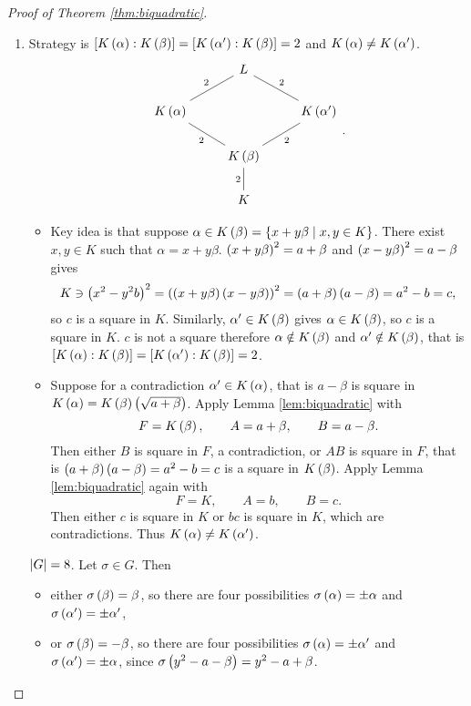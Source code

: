 \begin{proof}[Proof of Theorem \ref{thm:biquadratic}]
\hfill
\begin{enumerate}
\item Strategy is $ \left[ K\left( \alpha \right) : K\left( \beta \right) \right] = \left[ K\left( \alpha' \right) : K\left( \beta \right) \right] = 2 $ and $ K\left( \alpha \right) \ne K\left( \alpha' \right) $.
$$
\begin{tikzcd}
& L & \\
K\rb{\alpha} \arrow[dash]{ur}{2} & & K\rb{\alpha'} \arrow[dash, swap]{ul}{2} \\
& K\rb{\beta} \arrow[dash]{ul}{2} \arrow[dash, swap]{ur}{2} & \\
& K \arrow[dash]{u}{2} &
\end{tikzcd}.
$$
\begin{itemize}
\item Key idea is that suppose $ \alpha \in K\left( \beta \right) = \left\{ x + y\beta \mid x, y \in K \right\} $. There exist $ x, y \in K $ such that $ \alpha = x + y\beta $. $ \left( x + y\beta \right)^2 = a + \beta $ and $ \left( x - y\beta \right)^2 = a - \beta $ gives
$$ K \ni \left( x^2 - y^2b \right)^2 = \left( \left( x + y\beta \right)\left( x - y\beta \right) \right)^2 = \left( a + \beta \right)\left( a - \beta \right) = a^2 - b = c, $$
so $ c $ is a square in $ K $. Similarly, $ \alpha' \in K\left( \beta \right) $ gives $ \alpha \in K\left( \beta \right) $, so $ c $ is a square in $ K $. $ c $ is not a square therefore $ \alpha \notin K\left( \beta \right) $ and $ \alpha' \notin K\left( \beta \right) $, that is $ \left[ K\left( \alpha \right) : K\left( \beta \right) \right] = \left[ K\left( \alpha' \right) : K\left( \beta \right) \right] = 2 $.
\item Suppose for a contradiction $ \alpha' \in K\left( \alpha \right) $, that is $ a - \beta $ is square in $ K\left( \alpha \right) = K\left( \beta \right)\left( \sqrt{a + \beta} \right) $. Apply Lemma \ref{lem:biquadratic} with
$$ F = K\left( \beta \right), \qquad A = a + \beta, \qquad B = a - \beta. $$
Then either $ B $ is square in $ F $, a contradiction, or $ AB $ is square in $ F $, that is $ \left( a + \beta \right)\left( a - \beta \right) = a^2 - b = c $ is a square in $ K\left( \beta \right) $. Apply Lemma \ref{lem:biquadratic} again with
$$ F = K, \qquad A = b, \qquad B = c. $$
Then either $ c $ is square in $ K $ or $ bc $ is square in $ K $, which are contradictions. Thus $ K\left( \alpha \right) \ne K\left( \alpha' \right) $.
\end{itemize}
$ \left\lvert G \right\rvert = 8 $. Let $ \sigma \in G $. Then
\begin{itemize}
\item either $ \sigma\left( \beta \right) = \beta $, so there are four possibilities $ \sigma\left( \alpha \right) = \pm\alpha $ and $ \sigma\left( \alpha' \right) = \pm\alpha' $,
\item or $ \sigma\left( \beta \right) = -\beta $, so there are four possibilities $ \sigma\left( \alpha \right) = \pm\alpha' $ and $ \sigma\left( \alpha' \right) = \pm\alpha $, since $ \sigma\left( y^2 - a - \beta \right) = y^2 - a + \beta $.

\end{itemize}
\end{enumerate}
\end{proof}
